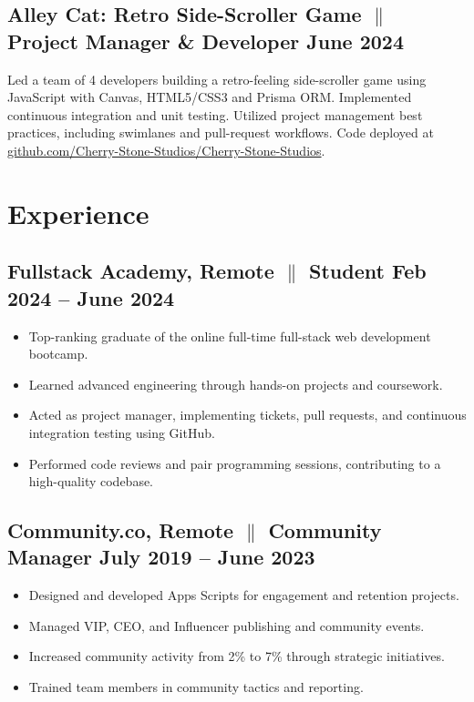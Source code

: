 \documentclass[a4paper,10pt]{article}
\begin{document}
\subsection{Alley Cat: Retro Side-Scroller Game {$\parallel$}{
                  Project Manager
                  \& Developer}
      \hfill \textbf{June 2024}
}
{Led a team of 4 developers building a retro-feeling
      side-scroller game using JavaScript with Canvas, HTML5/CSS3 and Prisma ORM. Implemented continuous integration and unit testing. Utilized project management best practices, including swimlanes and pull-request workflows. Code deployed at \href{https://github.com/Cherry-Stone-Studios/Cherry-Stone-Studios}{github.com/Cherry-Stone-Studios/Cherry-Stone-Studios}.}

\section{Experience}

\subsection{Fullstack Academy, Remote {$\parallel$}{ Student} \hfill
      \textbf{Feb
            2024 – June
            2024}}
\begin{itemize}
      \item Top-ranking graduate of the online full-time full-stack web
            development
            bootcamp.
      \item Learned advanced engineering through
            hands-on
            projects and coursework.
      \item Acted as project manager, implementing tickets, pull requests, and
            continuous integration testing using GitHub.
      \item Performed code reviews and pair programming sessions, contributing
            to a high-quality codebase.
\end{itemize}

\subsection{Community.co, Remote {$\parallel$}{ Community Manager} \hfill
      \textbf{July 2019 – June
            2023}}
\begin{itemize}
      \item Designed and developed Apps Scripts for engagement and retention
            projects.
      \item Managed VIP, CEO, and Influencer publishing and community
            events.
      \item Increased community activity from 2\% to 7\% through
            strategic
            initiatives.
      \item Trained team members in community tactics and reporting.
\end{itemize}
\end{document}
